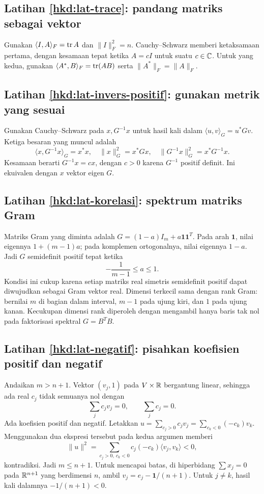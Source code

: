 \subsection*{Latihan \ref{hkd:lat-trace}: pandang matriks sebagai vektor}
Gunakan $\langle I,A\rangle_F=\operatorname{tr} A$ dan $\|I\|_F^2=n$.
Cauchy--Schwarz memberi ketaksamaan pertama, dengan kesamaan
tepat ketika $A=cI$ untuk suatu $c\in\mathbb{C}$.
Untuk yang kedua, gunakan
$\langle A^*,B\rangle_F=\operatorname{tr}(AB)$ serta $\|A^*\|_F=\|A\|_F$.

\subsection*{Latihan \ref{hkd:lat-invers-positif}: gunakan metrik yang sesuai}
Gunakan Cauchy--Schwarz pada $x,G^{-1}x$ untuk hasil kali dalam
$\langle u,v\rangle_G=u^*Gv$. Ketiga besaran yang muncul adalah
\[
    \langle x,G^{-1}x\rangle_G=x^*x,\quad
    \|x\|_G^2=x^*Gx,\quad
    \|G^{-1}x\|_G^2=x^*G^{-1}x.
\]
Kesamaan berarti $G^{-1}x=cx$, dengan $c>0$ karena $G^{-1}$
positif definit. Ini ekuivalen dengan $x$ vektor eigen $G$.

\subsection*{Latihan \ref{hkd:lat-korelasi}: spektrum matriks Gram}
Matriks Gram yang diminta adalah
$G=(1-a)I_m+a\boldsymbol{1}\boldsymbol{1}^T$.
Pada arah $\boldsymbol{1}$, nilai eigennya $1+(m-1)a$;
pada komplemen ortogonalnya, nilai eigennya $1-a$.
Jadi $G$ semidefinit positif tepat ketika
\[
    -\frac1{m-1}\le a\le1.
\]
Kondisi ini cukup karena setiap matriks real simetris semidefinit
positif dapat diwujudkan sebagai Gram vektor real.
Dimensi terkecil sama dengan rank Gram: bernilai $m$ di bagian
dalam interval, $m-1$ pada ujung kiri, dan $1$ pada ujung kanan.
Kecukupan dimensi rank diperoleh dengan mengambil hanya baris
tak nol pada faktorisasi spektral $G=B^TB$.

\subsection*{Latihan \ref{hkd:lat-negatif}: pisahkan koefisien positif dan negatif}
Andaikan $m>n+1$. Vektor $(v_j,1)$ pada $V\times\mathbb{R}$
bergantung linear, sehingga ada real $c_j$ tidak semuanya nol dengan
\[
    \sum_jc_jv_j=0,\qquad \sum_jc_j=0.
\]
Ada koefisien positif dan negatif. Letakkan
$u=\sum_{c_j>0}c_jv_j=\sum_{c_k<0}(-c_k)v_k$.
Menggunakan dua ekspresi tersebut pada kedua argumen memberi
\[
    \|u\|^2=\sum_{c_j>0,\ c_k<0}c_j(-c_k)\langle v_j,v_k\rangle<0,
\]
kontradiksi. Jadi $m\le n+1$.
Untuk mencapai batas, di hiperbidang $\sum x_j=0$ pada $\mathbb{R}^{n+1}$
yang berdimensi $n$, ambil
$v_j=e_j-\boldsymbol{1}/(n+1)$.
Untuk $j\ne k$, hasil kali dalamnya $-1/(n+1)<0$.
\fi
